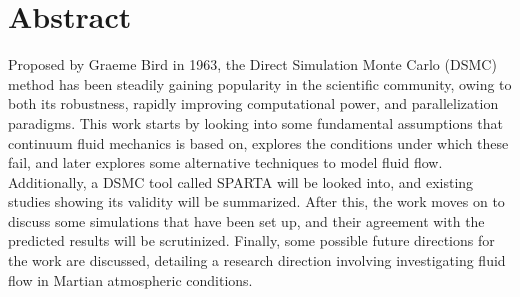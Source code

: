 \cleardoublepage
\chapter*{Abstract}

Proposed by Graeme Bird in 1963, the Direct Simulation Monte Carlo (DSMC) method has been steadily gaining popularity in the scientific community, owing to both its robustness, rapidly improving computational power, and parallelization paradigms. This work starts by looking into some fundamental assumptions that continuum fluid mechanics is based on, explores the conditions under which these fail, and later explores some alternative techniques to model fluid flow. Additionally, a DSMC tool called SPARTA will be looked into, and existing studies showing its validity will be summarized. After this, the work moves on to discuss some simulations that have been set up, and their agreement with the predicted results will be scrutinized. Finally, some possible future directions for the work are discussed, detailing a research direction involving investigating fluid flow in Martian atmospheric conditions. 